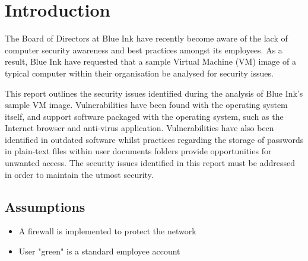 \section{Introduction}

The Board of Directors at Blue Ink have recently become aware of the lack of computer security awareness and best practices amongst its employees. As a result, Blue Ink have requested that a sample Virtual Machine (VM) image of a typical computer within their organisation be analysed for security issues.

This report outlines the security issues identified during the analysis of Blue Ink's sample VM image. Vulnerabilities have been found with the operating system itself, and support software packaged with the operating system, such as the Internet browser and anti-virus application. Vulnerabilities have also been identified in outdated software whilst practices regarding the storage of passwords in plain-text files within user documents folders provide opportunities for unwanted access. The security issues identified in this report must be addressed in order to maintain the utmost security.

\subsection{Assumptions}

\begin{itemize}
\item A firewall is implemented to protect the network
\item User "green" is a standard employee account
\end{itemize}
